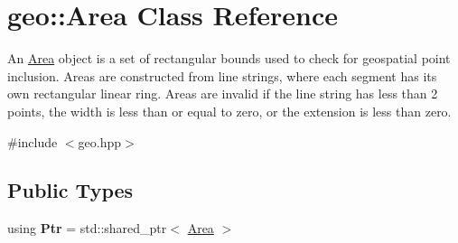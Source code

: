\hypertarget{classgeo_1_1Area}{}\section{geo\+:\+:Area Class Reference}
\label{classgeo_1_1Area}


An \hyperlink{classgeo_1_1Area}{Area} object is a set of rectangular bounds used to check for geospatial point inclusion. Areas are constructed from line strings, where each segment has it\textquotesingle{}s own rectangular linear ring. Areas are invalid if the line string has less than 2 points, the width is less than or equal to zero, or the extension is less than zero.  




{\ttfamily \#include $<$geo.\+hpp$>$}

\subsection*{Public Types}
\begin{DoxyCompactItemize}
\item 
using {\bfseries Ptr} = std\+::shared\+\_\+ptr$<$ \hyperlink{classgeo_1_1Area}{Area} $>$\hypertarget{classgeo_1_1Area_ac41a4e39b3fd4614106df968a0b50850}{}\label{classgeo_1_1Area_ac41a4e39b3fd4614106df968a0b50850}

\end{DoxyCompactItemize}
